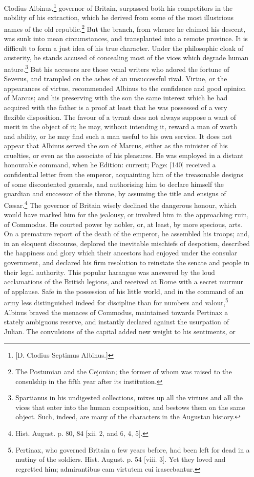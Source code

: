 Clodius Albinus,\footnote{[D. Clodius Septimus Albinus.]} governor of Britain, surpassed both his competitors in the nobility of his extraction, which he derived from some of the most illustrious names of the old republic.\footnote{The Postumian and the Cejonian; the former of whom was raised to the consulship in the fifth year after its institution.} But the branch, from whence he claimed his descent, was sunk into mean circumstances, and transplanted into a remote province. It is difficult to form a just idea of his true character. Under the philosophic cloak of austerity, he stands accused of concealing most of the vices which degrade human nature.\footnote{Spartianus in his undigested collections, mixes up all the virtues and all the vices that enter into the human composition, and bestows them on the same object. Such, indeed, are many of the characters in the Augustan history.} But his accusers are those venal writers who adored the fortune of Severus, and trampled on the ashes of an unsuccessful rival. Virtue, or the appearances of virtue, recommended Albinus to the confidence and good opinion of Marcus; and his preserving with the son the same interest which he had acquired with the father is a proof at least that he was possessed of a very flexible disposition. The favour of a tyrant does not always suppose a want of merit in the object of it; he may, without intending it, reward a man of worth and ability, or he may find such a man useful to his own service. It does not appear that Albinus served the son of Marcus, either as the minister of his cruelties, or even as the associate of his pleasures. He was employed in a distant honourable command, when he Edition: current; Page: [140] received a confidential letter from the emperor, acquainting him of the treasonable designs of some discontented generals, and authorising him to declare himself the guardian and successor of the throne, by assuming the title and ensigns of Cæsar.\footnote{Hist. August. p. 80, 84 [xii. 2, and 6, 4, 5].} The governor of Britain wisely declined the dangerous honour, which would have marked him for the jealousy, or involved him in the approaching ruin, of Commodus. He courted power by nobler, or, at least, by more specious, arts. On a premature report of the death of the emperor, he assembled his troops; and, in an eloquent discourse, deplored the inevitable mischiefs of despotism, described the happiness and glory which their ancestors had enjoyed under the consular government, and declared his firm resolution to reinstate the senate and people in their legal authority. This popular harangue was answered by the loud acclamations of the British legions, and received at Rome with a secret murmur of applause. Safe in the possession of his little world, and in the command of an army less distinguished indeed for discipline than for numbers and valour,\footnote{Pertinax, who governed Britain a few years before, had been left for dead in a mutiny of the soldiers. Hist. August. p. 54 [viii. 3]. Yet they loved and regretted him; admirantibus eam virtutem cui irascebantur.} Albinus braved the menaces of Commodus, maintained towards Pertinax a stately ambiguous reserve, and instantly declared against the usurpation of Julian. The convulsions of the capital added new weight to his sentiments, or 